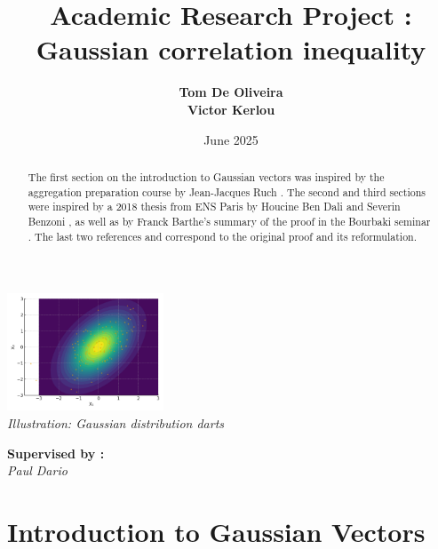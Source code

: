 \documentclass[12pt]{article}
\title{\huge\textbf{Academic Research Project :  Gaussian correlation inequality}}
\author{
    \textbf{Tom De Oliveira}\\
    \textbf{Victor Kerlou}
}
\date{June 2025}
\begin{document}
\maketitle

\vspace{1cm} %

\begin{center}
    \includegraphics[width=0.35\textwidth]{photo.png} \\[1em]
    \textit{Illustration: Gaussian distribution darts}
\end{center}

\vspace{2cm} %

\begin{flushright}
    \textbf{Supervised by :} \\
    \textit{Paul Dario}
\end{flushright}

\vspace{1cm} %

\newpage %

\begin{abstract}
The first section on the introduction to Gaussian vectors was inspired by the aggregation preparation course by Jean-Jacques Ruch \cite{ruch}.
The second and third sections were inspired by a 2018 thesis from ENS Paris by Houcine Ben Dali and Severin Benzoni \cite{benzoni}, as well as by Franck Barthe's summary of the proof in the Bourbaki seminar \cite{barthe}. The last two references \cite{Royen} and \cite{Matlak} correspond to the original proof and its reformulation.
\end{abstract}

\newpage
\renewcommand{\contentsname}{Summary}
\tableofcontents %

\newpage

\section{Introduction to Gaussian Vectors}
\end{document}
